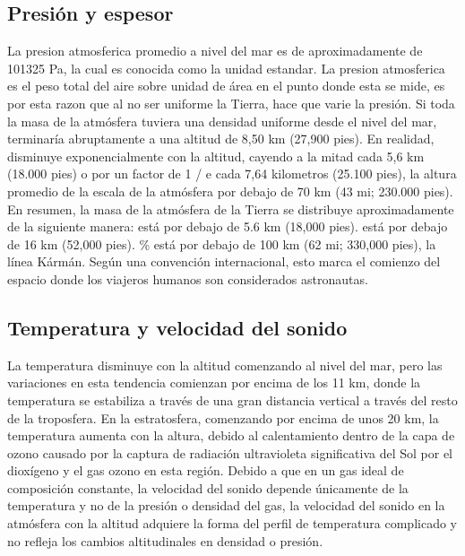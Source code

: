 \documentclass{article}
\begin{document}
\subsection{Presión y espesor}
La presion atmosferica promedio a nivel del mar es de aproximadamente de 101325 Pa, la cual es conocida como la unidad estandar.
\newline
La presion atmosferica es el peso total del aire sobre unidad de área en el punto donde esta se mide, es por esta razon que al no ser uniforme la Tierra, hace que varie la presión.
\newline
Si toda la masa de la atmósfera tuviera una densidad uniforme desde el nivel del mar, terminaría abruptamente a una altitud de 8,50 km (27,900 pies). En realidad, disminuye exponencialmente con la altitud, cayendo a la mitad cada 5,6 km (18.000 pies) o por un factor de 1 / e cada 7,64 kilometros (25.100 pies), la altura promedio de la escala de la atmósfera por debajo de 70 km (43 mi; 230.000 pies).
\newline
En resumen, la masa de la atmósfera de la Tierra se distribuye aproximadamente de la siguiente manera:
\newline
está por debajo de 5.6 km (18,000 pies).
\newline
está por debajo de 16 km (52,000 pies).
\% está por debajo de 100 km (62 mi; 330,000 pies), la línea Kármán. Según una convención internacional, esto marca el comienzo del espacio donde los viajeros humanos son considerados astronautas.

\subsection{Temperatura y velocidad del sonido}
La temperatura disminuye con la altitud comenzando al nivel del mar, pero las variaciones en esta tendencia comienzan por encima de los 11 km, donde la temperatura se estabiliza a través de una gran distancia vertical a través del resto de la troposfera. En la estratosfera, comenzando por encima de unos 20 km, la temperatura aumenta con la altura, debido al calentamiento dentro de la capa de ozono causado por la captura de radiación ultravioleta significativa del Sol por el dioxígeno y el gas ozono en esta región.
\newline
Debido a que en un gas ideal de composición constante, la velocidad del sonido depende únicamente de la temperatura y no de la presión o densidad del gas, la velocidad del sonido en la atmósfera con la altitud adquiere la forma del perfil de temperatura complicado y no refleja los cambios altitudinales en densidad o presión.
\end{document}
